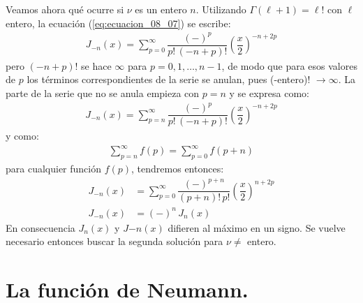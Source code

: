 Veamos ahora qué ocurre si $\nu$ es un entero $n$. Utilizando $\Gamma (\ell + 1) = \ell !$ con $\ell$ entero, la ecuación (\ref{eq:ecuacion_08_07}) se escribe:
\begin{align*}
J_{-n} (x) = \sum_{p=0}^{\infty} \dfrac{(-)^{p}}{p! \, (-n + p)!} \left( \dfrac{x}{2} \right)^{-n+2p}
\end{align*}
pero $(-n + p)!$ se hace $\infty$ para $p = 0, 1, \ldots, n-1$, de modo que para esos valores de $p$ los términos correspondientes de la serie se anulan, pues (-entero)! $\to \infty$. La parte de la serie que no se anula empieza con $p = n$ y se expresa como:
\begin{align*}
J_{-n} (x) = \sum_{p=n}^{\infty} \dfrac{(-)^{p}}{p! \, (-n + p)!} \left( \dfrac{x}{2} \right)^{-n+2p}
\end{align*}
y como:
\begin{align*}
\sum_{p=n}^{\infty} f(p) = \sum_{p=0}^{\infty} f(p + n)
\end{align*}
para cualquier función $f(p)$, tendremos entonces:
\begin{align*}
J_{-n} (x) &= \sum_{p=0}^{\infty} \dfrac{(-)^{p+n}}{(p + n)! \, p!} \left( \dfrac{x}{2} \right)^{n+2p} \\[0.5em]
J_{-n} (x) &= (-)^{n} \, J_{n}(x)
\end{align*}
En consecuencia $J_{n}(x)$ y $J{-n}(x)$ difieren al máximo en un signo. Se vuelve necesario entonces buscar la segunda solución para $\nu \neq$ entero.

\section{La función de Neumann.}

